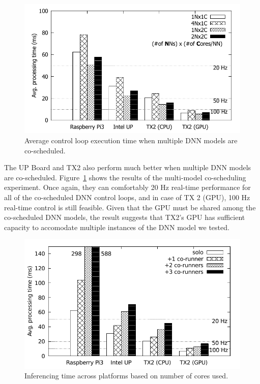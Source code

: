 \begin{figure}[h]
  \centering
  \includegraphics[width=.45\textwidth]{figs/compare_model}
  \caption{Average control loop execution time when multiple DNN
    models are co-scheduled. }
  \label{fig:sys_model}
\end{figure}

The UP Board and TX2 also perform much better when multiple DNN models
are co-scheduled. Figure~\ref{fig:sys_model} shows the results of the
multi-model co-scheduling experiment. Once again, they can comfortably
20 Hz real-time performance for all of the co-scheduled DNN control
loops, and in case of TX 2 (GPU), 100 Hz real-time control is still
feasible. Given that the GPU must be shared among the co-scheduled DNN
models, the result suggests that TX2's GPU has sufficient capacity to
accomodate multiple instances of the DNN model we tested.


\begin{figure}[h]
  \centering
  \includegraphics[width=.45\textwidth]{figs/compare_benchmark}
  \caption{Inferencing time across platforms based on number of cores 
used.}
  \label{fig:sys_bench}
\end{figure} 

